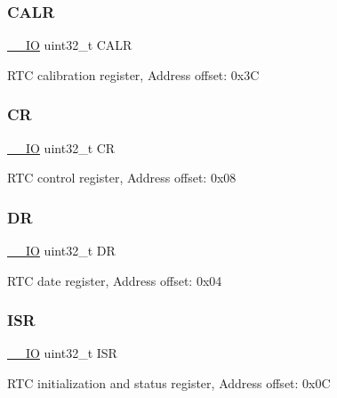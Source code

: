 \subsubsection{\texorpdfstring{C\+A\+LR}{CALR}}
{\footnotesize\ttfamily \mbox{\hyperlink{core__sc300_8h_aec43007d9998a0a0e01faede4133d6be}{\+\_\+\+\_\+\+IO}} uint32\+\_\+t C\+A\+LR}

R\+TC calibration register, Address offset\+: 0x3C \mbox{\label{struct_r_t_c___type_def_ab40c89c59391aaa9d9a8ec011dd0907a}} 
\subsubsection{\texorpdfstring{CR}{CR}}
{\footnotesize\ttfamily \mbox{\hyperlink{core__sc300_8h_aec43007d9998a0a0e01faede4133d6be}{\+\_\+\+\_\+\+IO}} uint32\+\_\+t CR}

R\+TC control register, Address offset\+: 0x08 \mbox{\label{struct_r_t_c___type_def_a3df0d8dfcd1ec958659ffe21eb64fa94}} 
\subsubsection{\texorpdfstring{DR}{DR}}
{\footnotesize\ttfamily \mbox{\hyperlink{core__sc300_8h_aec43007d9998a0a0e01faede4133d6be}{\+\_\+\+\_\+\+IO}} uint32\+\_\+t DR}

R\+TC date register, Address offset\+: 0x04 \mbox{\label{struct_r_t_c___type_def_ab3c49a96815fcbee63d95e1e74f20e75}} 
\subsubsection{\texorpdfstring{I\+SR}{ISR}}
{\footnotesize\ttfamily \mbox{\hyperlink{core__sc300_8h_aec43007d9998a0a0e01faede4133d6be}{\+\_\+\+\_\+\+IO}} uint32\+\_\+t I\+SR}

R\+TC initialization and status register, Address offset\+: 0x0C \mbox{\label{struct_r_t_c___type_def_ac9b4c6c5b29f3461ce3f875eea69f35b}} 
